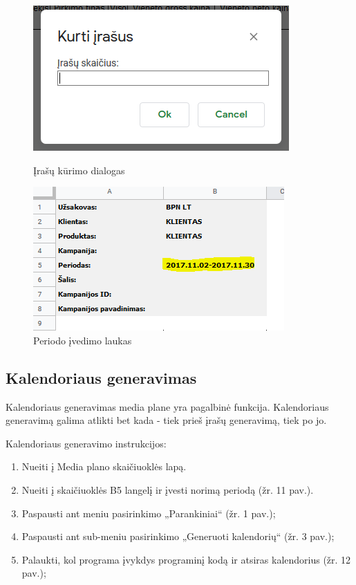 \begin{figure}[h]
    \centering
    \begin{minipage}{0.45\textwidth}
        \centering
        \includegraphics[scale=0.7]{Images/Screenshots/modal-generate-records.PNG} 
        \caption{Įrašų kūrimo dialogas}
    \end{minipage}\hfill
    \begin{minipage}{0.45\textwidth}
        \centering
        \includegraphics[scale=0.7]{Images/Screenshots/calendar-period-creation.PNG} 
        \caption{Periodo įvedimo laukas}
    \end{minipage}
\end{figure}

\subsection{Kalendoriaus generavimas}
Kalendoriaus generavimas media plane yra pagalbinė funkcija. Kalendoriaus generavimą galima atlikti bet kada - tiek prieš įrašų generavimą, tiek po jo.

\bigskip
Kalendoriaus generavimo instrukcijos: 
\begin{enumerate}
    \itemsep0em 
    \item Nueiti į Media plano skaičiuoklės lapą.
    \item Nueiti į skaičiuoklės B5 langelį ir įvesti norimą periodą (žr. 11 pav.).
    \item Paspausti ant meniu pasirinkimo „Parankiniai“ (žr. 1 pav.);
    \item Paspausti ant sub-meniu pasirinkimo „Generuoti kalendorių“ (žr. 3 pav.);
    \item Palaukti, kol programa įvykdys programinį kodą ir atsiras kalendorius (žr. 12 pav.);
\end{enumerate}

